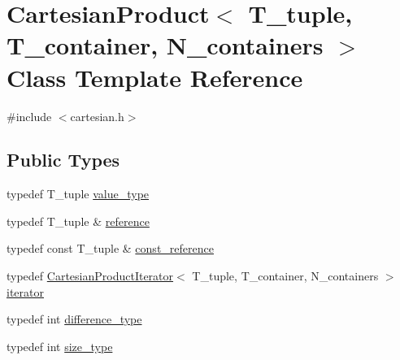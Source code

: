 \hypertarget{classCartesianProduct}{}\section{Cartesian\+Product$<$ T\+\_\+tuple, T\+\_\+container, N\+\_\+containers $>$ Class Template Reference}
\label{classCartesianProduct}


{\ttfamily \#include $<$cartesian.\+h$>$}

\subsection*{Public Types}
\begin{DoxyCompactItemize}
\item 
typedef T\+\_\+tuple \hyperlink{classCartesianProduct_a8bffc8ff5a1c45a97c17e00cf09600e8}{value\+\_\+type}
\item 
typedef T\+\_\+tuple \& \hyperlink{classCartesianProduct_af4731e9a8b090b881429d82b73b86f69}{reference}
\item 
typedef const T\+\_\+tuple \& \hyperlink{classCartesianProduct_a4dfd93cd4286d19c22217de7c5518be7}{const\+\_\+reference}
\item 
typedef \hyperlink{classCartesianProductIterator}{Cartesian\+Product\+Iterator}$<$ T\+\_\+tuple, T\+\_\+container, N\+\_\+containers $>$ \hyperlink{classCartesianProduct_ad09a4b0d85a53d95634642e3cc3560ce}{iterator}
\item 
typedef int \hyperlink{classCartesianProduct_a2a7b0c4ea3de70992be674b51c9833e1}{difference\+\_\+type}
\item 
typedef int \hyperlink{classCartesianProduct_a74086bf2f3ee647ed66791e7f8faa833}{size\+\_\+type}
\end{DoxyCompactItemize}

